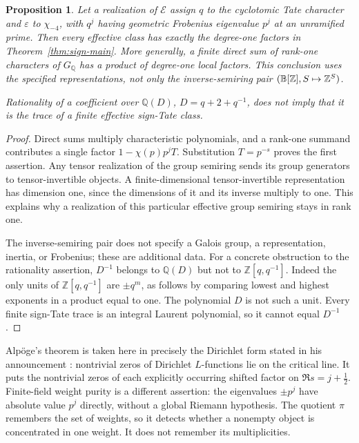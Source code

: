 \documentclass[11pt]{article}
\newcommand{\Z}{\mathbb Z}\newcommand{\N}{\mathbb N}\newcommand{\Q}{\mathbb Q}
\newcommand{\eps}{\varepsilon}\newcommand{\supp}{\operatorname{supp}}
\newtheorem{proposition}[theorem]{Proposition}
\theoremstyle{definition}\newtheorem{definition}[theorem]{Definition}
\begin{document}
\begin{proposition}\label{prop:degree}
Let a realization of $\mathcal E$ assign $q$ to the cyclotomic Tate character and $\eps$ to $\chi_{-4}$, with $q^j$ having geometric Frobenius eigenvalue $p^j$ at an unramified prime. Then every effective class has exactly the degree-one factors in Theorem~\ref{thm:sign-main}. More generally, a finite direct sum of rank-one characters of $G_{\Q}$ has a product of degree-one local factors. This conclusion uses the specified representations, not only the inverse-semiring pair $(\B[\Z],S\mapsto\Z^S)$.

Rationality of a coefficient over $\Q(D)$, $D=q+2+q^{-1}$, does not imply that it is the trace of a finite effective sign-Tate class.
\end{proposition}
\begin{proof}
Direct sums multiply characteristic polynomials, and a rank-one summand contributes a single factor $1-\chi(p)p^jT$. Substitution $T=p^{-s}$ proves the first assertion. Any tensor realization of the group semiring sends its group generators to tensor-invertible objects. A finite-dimensional tensor-invertible representation has dimension one, since the dimensions of it and its inverse multiply to one. This explains why a realization of this particular effective group semiring stays in rank one.

The inverse-semiring pair does not specify a Galois group, a representation, inertia, or Frobenius; these are additional data. For a concrete obstruction to the rationality assertion, $D^{-1}$ belongs to $\Q(D)$ but not to $\Z[q,q^{-1}]$. Indeed the only units of $\Z[q,q^{-1}]$ are $\pm q^m$, as follows by comparing lowest and highest exponents in a product equal to one. The polynomial $D$ is not such a unit. Every finite sign-Tate trace is an integral Laurent polynomial, so it cannot equal $D^{-1}$.
\end{proof}

Alp\"oge's theorem is taken here in precisely the Dirichlet form stated in his announcement \citep{Alpoge}: nontrivial zeros of Dirichlet $L$-functions lie on the critical line. It puts the nontrivial zeros of each explicitly occurring shifted factor on $\Re s=j+\tfrac12$. Finite-field weight purity is a different assertion: the eigenvalues $\pm p^j$ have absolute value $p^j$ directly, without a global Riemann hypothesis. The quotient $\pi$ remembers the set of weights, so it detects whether a nonempty object is concentrated in one weight. It does not remember its multiplicities.
\end{document}
